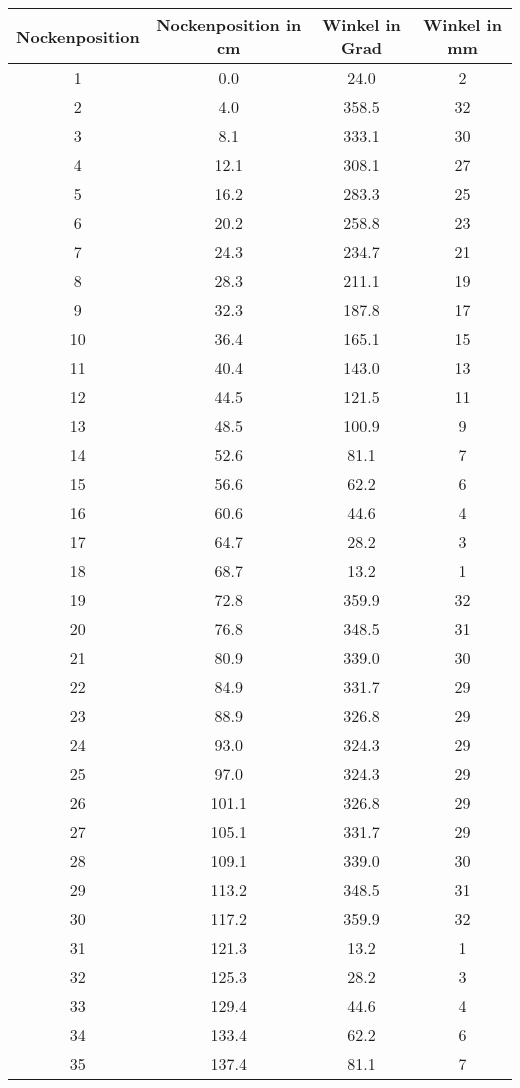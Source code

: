 \documentclass[10pt, a4paper]{article}
\begin{document}
\begin{center}
	\begin{tabular}{c|c|c|c}
		Nockenposition & Nockenposition in cm & Winkel in Grad & Winkel in mm \\
		\hline
		1 & 0.0 & 24.0 & 2 \\
		2 & 4.0 & 358.5 & 32 \\
		3 & 8.1 & 333.1 & 30 \\
		4 & 12.1 & 308.1 & 27 \\
		5 & 16.2 & 283.3 & 25 \\
		6 & 20.2 & 258.8 & 23 \\
		7 & 24.3 & 234.7 & 21 \\
		8 & 28.3 & 211.1 & 19 \\
		9 & 32.3 & 187.8 & 17 \\
		10 & 36.4 & 165.1 & 15 \\
		11 & 40.4 & 143.0 & 13 \\
		12 & 44.5 & 121.5 & 11 \\
		13 & 48.5 & 100.9 & 9 \\
		14 & 52.6 & 81.1 & 7 \\
		15 & 56.6 & 62.2 & 6 \\
		16 & 60.6 & 44.6 & 4 \\
		17 & 64.7 & 28.2 & 3 \\
		18 & 68.7 & 13.2 & 1 \\
		19 & 72.8 & 359.9 & 32 \\
		20 & 76.8 & 348.5 & 31 \\
		21 & 80.9 & 339.0 & 30 \\
		22 & 84.9 & 331.7 & 29 \\
		23 & 88.9 & 326.8 & 29 \\
		24 & 93.0 & 324.3 & 29 \\
		25 & 97.0 & 324.3 & 29 \\
		26 & 101.1 & 326.8 & 29 \\
		27 & 105.1 & 331.7 & 29 \\
		28 & 109.1 & 339.0 & 30 \\
		29 & 113.2 & 348.5 & 31 \\
		30 & 117.2 & 359.9 & 32 \\
		31 & 121.3 & 13.2 & 1 \\
		32 & 125.3 & 28.2 & 3 \\
		33 & 129.4 & 44.6 & 4 \\
		34 & 133.4 & 62.2 & 6 \\
		35 & 137.4 & 81.1 & 7 \\

\end{tabular}
\end{center}
\end{document}
